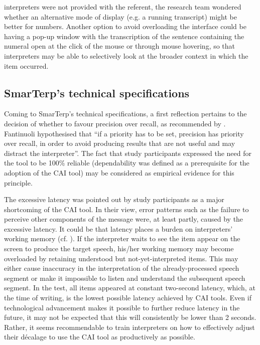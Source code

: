 interpreters were not provided with the referent, the research team wondered whether an alternative mode of display (e.g. a running transcript) might be better for numbers. Another option to avoid overloading the interface could be having a pop-up window with the transcription of the sentence containing the numeral open at the click of the mouse or through mouse hovering, so that interpreters may be able to selectively look at the broader context in which the item occurred.



\subsection{SmarTerp's technical specifications}


Coming to SmarTerp’s technical specifications, a first reflection pertains to the decision of whether to favour precision over recall, as recommended by \citet{fantinuoli2017speech}. Fantinuoli hypothesised that ``if a priority has to be set, precision has priority over recall, in order to avoid producing results that are not useful and may distract the interpreter''. The fact that study participants expressed the need for the tool to be 100\% reliable (dependability was defined as a prerequisite for the adoption of the CAI tool) may be considered as empirical evidence for this principle.

The excessive latency was pointed out by study participants as a major shortcoming of the CAI tool. In their view, error patterns such as the failure to perceive other components of the message were, at least partly, caused by the excessive latency. It could be that latency places a burden on interpreters’ working memory (cf. \cite{cowan2010magical}). If the interpreter waits to see the item appear on the screen to produce the target speech, his/her working memory may become overloaded by retaining understood but not-yet-interpreted items. This may either cause inaccuracy in the interpretation of the already-processed speech segment or make it impossible to listen and understand the subsequent speech segment. In the test, all items appeared at constant two-second latency, which, at the time of writing, is the lowest possible latency achieved by CAI tools. Even if technological advancement makes it possible to further reduce latency in the future, it may not be expected that this will consistently be lower than 2 seconds. Rather, it seems recommendable to train interpreters on how to effectively adjust their décalage to use the CAI tool as productively as possible.

